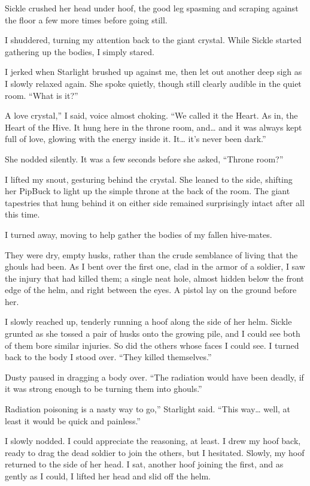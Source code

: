 Sickle crushed her head under hoof, the good leg spasming and scraping against the floor a few more times before going still.

I shuddered, turning my attention back to the giant crystal. While Sickle started gathering up the bodies, I simply stared.

I jerked when Starlight brushed up against me, then let out another deep sigh as I slowly relaxed again. She spoke quietly, though still clearly audible in the quiet room. “What is it?”

\leavevmode{}A love crystal,” I said, voice almost choking. “We called it the Heart. As in, the Heart of the Hive. It hung here in the throne room, and… and it was always kept full of love, glowing with the energy inside it. It… it’s never been dark.”

She nodded silently. It was a few seconds before she asked, “Throne room?”

I lifted my snout, gesturing behind the crystal. She leaned to the side, shifting her PipBuck to light up the simple throne at the back of the room. The giant tapestries that hung behind it on either side remained surprisingly intact after all this time.

I turned away, moving to help gather the bodies of my fallen hive-mates.

They were dry, empty husks, rather than the crude semblance of living that the ghouls had been. As I bent over the first one, clad in the armor of a soldier, I saw the injury that had killed them; a single neat hole, almost hidden below the front edge of the helm, and right between the eyes. A pistol lay on the ground before her.

I slowly reached up, tenderly running a hoof along the side of her helm. Sickle grunted as she tossed a pair of husks onto the growing pile, and I could see both of them bore similar injuries. So did the others whose faces I could see. I turned back to the body I stood over. “They killed themselves.”

Dusty paused in dragging a body over. “The radiation would have been deadly, if it was strong enough to be turning them into ghouls.”

\leavevmode{}Radiation poisoning is a nasty way to go,” Starlight said. “This way… well, at least it would be quick and painless.”

I slowly nodded. I could appreciate the reasoning, at least. I drew my hoof back, ready to drag the dead soldier to join the others, but I hesitated. Slowly, my hoof returned to the side of her head. I sat, another hoof joining the first, and as gently as I could, I lifted her head and slid off the helm.

